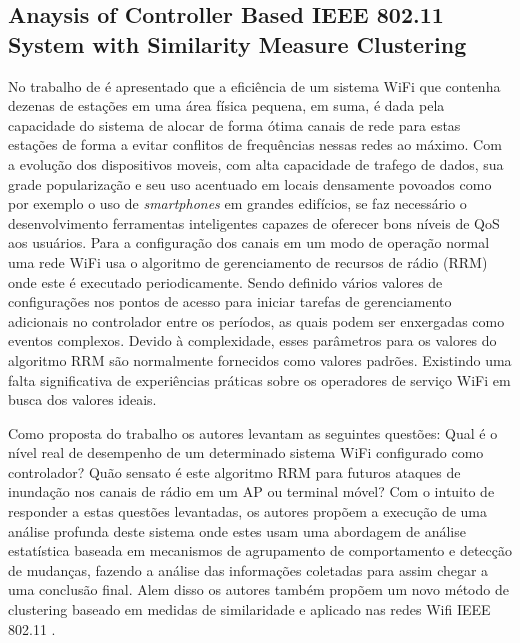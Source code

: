 \documentclass[ti,table]{texufpel} %
\begin{document}
     

  

  

\subsection{Anaysis of Controller Based IEEE 802.11 System with Similarity Measure Clustering} 

  

  

    No trabalho de \cite{art7gal2017anaysis} é apresentado que a eficiência de um sistema WiFi que contenha dezenas de estações em uma área física pequena, em suma, é dada pela capacidade do sistema de alocar de forma ótima canais de rede para estas estações de forma a evitar conflitos de frequências nessas redes ao máximo. Com a evolução dos dispositivos moveis, com alta capacidade de trafego de dados, sua grade popularização e seu uso acentuado em locais densamente povoados como por exemplo o uso de \textit{smartphones} em grandes edifícios, se faz necessário o desenvolvimento ferramentas inteligentes capazes de oferecer bons níveis de QoS aos usuários. Para a configuração dos canais em um modo de operação normal uma rede WiFi usa o algoritmo de gerenciamento de recursos de rádio (RRM) onde este é executado periodicamente. Sendo definido vários valores de configurações nos pontos de acesso para iniciar tarefas de gerenciamento adicionais no controlador entre os períodos, as quais podem ser enxergadas como eventos complexos. Devido à complexidade, esses parâmetros para os valores do algoritmo RRM são normalmente fornecidos como valores padrões. Existindo uma falta significativa de experiências práticas sobre os operadores de serviço WiFi em busca dos valores ideais. 

     

     Como proposta do trabalho os autores levantam as seguintes questões: Qual é o nível real de desempenho de um determinado sistema WiFi configurado como controlador? Quão sensato é este algoritmo RRM para futuros ataques de inundação nos canais de rádio em um AP ou terminal móvel? Com o intuito de responder a estas questões levantadas, os autores propõem a execução de uma análise profunda deste sistema onde estes usam uma abordagem de análise estatística baseada em mecanismos de agrupamento de comportamento e detecção de mudanças, fazendo a análise das informações coletadas para assim chegar a uma conclusão final. Alem disso os autores também propõem um novo método de clustering baseado em medidas de similaridade e aplicado nas redes Wifi IEEE 802.11 \cite{art7gal2017anaysis}.         
\end{document}

